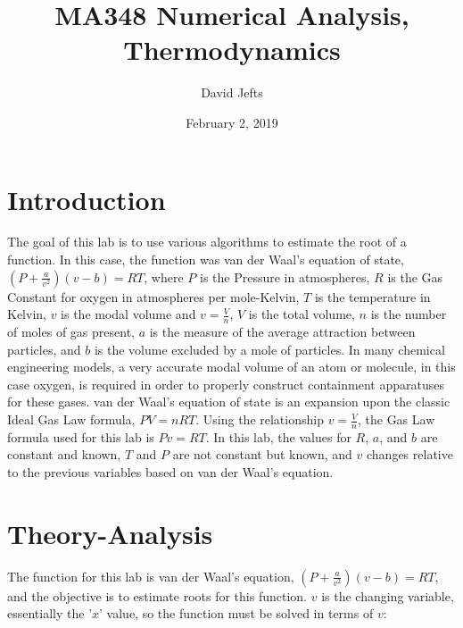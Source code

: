 \documentclass[12pt, letterpaper]{article}
\begin{document}
\setcounter{secnumdepth}{-1}

\title{MA348 Numerical Analysis, Thermodynamics}
\author{David Jefts}
\date{February 2, 2019}
\begin{titlepage}
	\centering
	\maketitle
	\centering
	\hfill
	\vfill
\end{titlepage}

\setlength{\voffset}{-0.5in}
\setlength{\headsep}{10pt}

\section{Introduction}
	The goal of this lab is to use various algorithms to estimate the root of a function. In this case, the function was van der Waal's equation of state, $(P+\frac{a}{v^2})(v-b)=RT$, where $P$ is the Pressure in atmospheres, $R$ is the Gas Constant for oxygen in atmospheres per mole-Kelvin, $T$ is the temperature in Kelvin, $v$ is the modal volume and $v=\frac{V}{n}$, $V$ is the total volume, $n$ is the number of moles of gas present, $a$ is the measure of the average attraction between particles, and $b$ is the volume excluded by a mole of particles. In many chemical engineering models, a very accurate modal volume of an atom or molecule, in this case oxygen,  is required in order to properly construct containment apparatuses for these gases. van der Waal's equation of state is an expansion upon the classic Ideal Gas Law formula, $PV=nRT$. Using the relationship $v=\frac{V}{n}$, the Gas Law formula used for this lab is $Pv=RT$. In this lab, the values for $R$, $a$, and $b$ are constant and known, $T$ and $P$ are not constant but known, and $v$ changes relative to the previous variables based on van der Waal's equation.

\section{Theory-Analysis}
	 The function for this lab is van der Waal's equation, $(P+\frac{a}{v^2})(v-b)=RT$, and the objective is to estimate roots for this function. $v$ is the changing variable, essentially the '$x$' value, so the function must be solved in terms of $v$:
\end{document}
